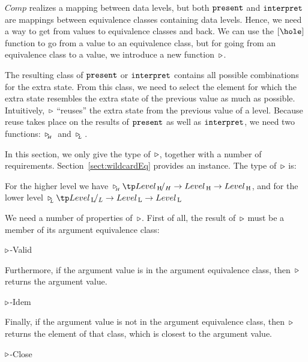$Comp$ realizes a mapping between data levels, but both ${\tt present}$ and ${\tt interpret}$ are mappings between equivalence classes containing data levels. Hence, we need a way to get from values to equivalence classes and back. We can use the $\eqhole$ function to go from a value to an equivalence class, but for going from an equivalence class to a value, we introduce a new function~$\triangleright$.

The resulting class of ${\tt present}$ or ${\tt interpret}$ contains all possible combinations for the extra state.
From this class, we need to select the element for which the extra state resembles the extra state of the previous value as much as possible. Intuitively,~$\triangleright$ ``reuses'' the extra state from the previous value of a level. Because reuse takes place on the results of ${\tt present}$ as well as ${\tt interpret}$, we need two functions: $\,\triangleright_{_{\!\!H}}\,$ and $\,\triangleright_{_{\!\!L}}\,$.

In this section, we only give the type of~$\triangleright$, together with a number of requirements. Section~\ref{sect:wildcardEq} provides an instance. The type of~$\triangleright$ is:


For the higher level we have $\reuze{H} \tp  \Eqclass{Level\H}{H} \to Level\H \to Level\H$, and for the lower level $\reuze{L} \tp  \Eqclass{Level\L}{L} \to Level\L \to Level\L$

We need a number of properties of~$\triangleright$. First of all, the result of~$\triangleright$ must be a member of its argument equivalence class:  

	{$\triangleright$-Valid}

Furthermore, if the argument value is in the argument equivalence class, then~$\triangleright$ returns the argument value.
 
	{$\triangleright$-Idem} 

Finally, if the argument value is not in the argument equivalence class, then~$\triangleright$ returns the element of that class, which is closest to the argument value.

		{$\triangleright$-Close} 

